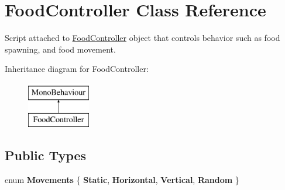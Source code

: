 \hypertarget{class_food_controller}{}\section{Food\+Controller Class Reference}
\label{class_food_controller}


Script attached to \hyperlink{class_food_controller}{Food\+Controller} object that controls behavior such as food spawning, and food movement.  


Inheritance diagram for Food\+Controller\+:\begin{figure}[H]
\begin{center}
\leavevmode
\includegraphics[height=2.000000cm]{class_food_controller}
\end{center}
\end{figure}
\subsection*{Public Types}
\begin{DoxyCompactItemize}
\item 
enum {\bfseries Movements} \{ {\bfseries Static}, 
{\bfseries Horizontal}, 
{\bfseries Vertical}, 
{\bfseries Random}
 \}\hypertarget{class_food_controller_ad3c2e51ce55236ad80384113f1593c79}{}\label{class_food_controller_ad3c2e51ce55236ad80384113f1593c79}

\end{DoxyCompactItemize}
